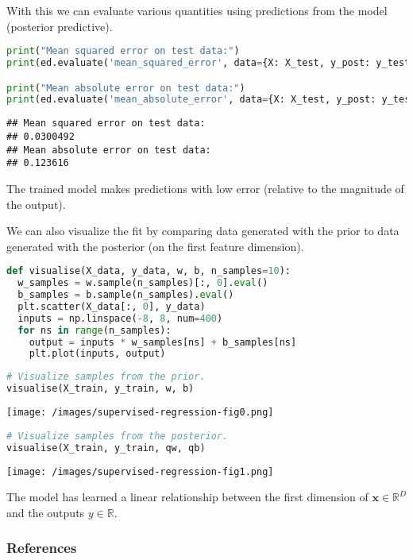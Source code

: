 With this we can evaluate various quantities using predictions from
the model (posterior predictive).
\begin{lstlisting}[language=Python]
print("Mean squared error on test data:")
print(ed.evaluate('mean_squared_error', data={X: X_test, y_post: y_test}))

print("Mean absolute error on test data:")
print(ed.evaluate('mean_absolute_error', data={X: X_test, y_post: y_test}))
\end{lstlisting}

\begin{lstlisting}
## Mean squared error on test data:
## 0.0300492
## Mean absolute error on test data:
## 0.123616
\end{lstlisting}

The trained model makes predictions with low error
(relative to the magnitude of the output).

We can also visualize the fit by comparing data generated with the
prior to data generated with the posterior (on the first feature
dimension).

\begin{lstlisting}[language=Python]
def visualise(X_data, y_data, w, b, n_samples=10):
  w_samples = w.sample(n_samples)[:, 0].eval()
  b_samples = b.sample(n_samples).eval()
  plt.scatter(X_data[:, 0], y_data)
  inputs = np.linspace(-8, 8, num=400)
  for ns in range(n_samples):
    output = inputs * w_samples[ns] + b_samples[ns]
    plt.plot(inputs, output)
\end{lstlisting}

\begin{lstlisting}[language=Python]
# Visualize samples from the prior.
visualise(X_train, y_train, w, b)
\end{lstlisting}

\texttt{[image: /images/supervised-regression-fig0.png]}

\begin{lstlisting}[language=Python]
# Visualize samples from the posterior.
visualise(X_train, y_train, qw, qb)
\end{lstlisting}

\texttt{[image: /images/supervised-regression-fig1.png]}

The model has learned a linear relationship between the
first dimension of $\mathbf{x}\in\mathbb{R}^D$ and the outputs
$y\in\mathbb{R}$.

\subsubsection{References}\label{references}
